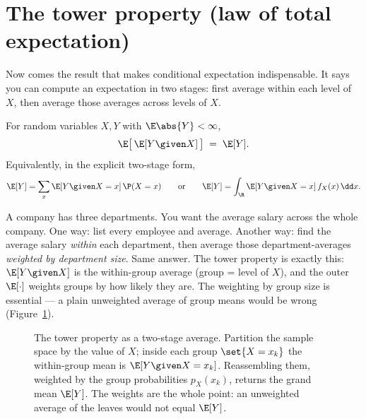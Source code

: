\section{The tower property (law of total expectation)}
\label{ch15:tower}

Now comes the result that makes conditional expectation indispensable. It says you can compute an
expectation in two stages: first average within each level of $X$, then average those averages across
levels of $X$.

\begin{theorem}
\label{ch15:thm-tower}
For random variables $X, Y$ with $\E\abs{Y} < \infty$,
\[
  \E\big[\,\E[Y \given X]\,\big] \;=\; \E[Y].
\]
Equivalently, in the explicit two-stage form,
\[
  \E[Y] = \sum_x \E[Y\given X = x]\,\P(X=x)
  \qquad\text{or}\qquad
  \E[Y] = \int_\R \E[Y \given X = x]\, f_X(x)\,\dd x.
\]
\end{theorem}

\begin{intuitionbox}
A company has three departments. You want the average salary across the whole company. One way: list
every employee and average. Another way: find the average salary \emph{within} each department, then
average those department-averages \emph{weighted by department size}. Same answer. The tower property
is exactly this: $\E[Y\given X]$ is the within-group average (group = level of $X$), and the outer
$\E[\cdot]$ weights groups by how likely they are. The weighting by group size is essential --- a plain
unweighted average of group means would be wrong (Figure~\ref{ch15:fig-tower-tree}).
\end{intuitionbox}

\begin{figure}[H]
\centering
{}
\caption{The tower property as a two-stage average. Partition the sample space by the value of $X$;
inside each group $\set{X = x_k}$ the within-group mean is $\E[Y\given X = x_k]$. Reassembling them,
weighted by the group probabilities $p_X(x_k)$, returns the grand mean $\E[Y]$. The weights are the
whole point: an unweighted average of the leaves would not equal $\E[Y]$.}
\label{ch15:fig-tower-tree}
\end{figure}

